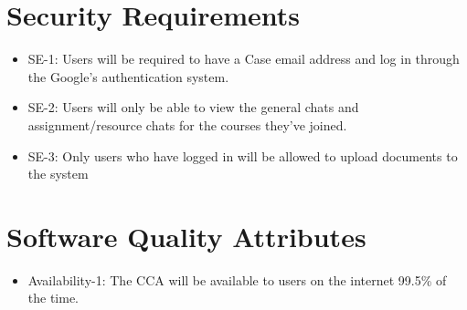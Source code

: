 \documentclass{scrreprt}
\begin{document}
\section{Security Requirements}
\begin{itemize}
	\item SE-1: Users will be required to have a Case email address and log in through the Google’s authentication system.
	\item SE-2: Users will only be able to view the general chats and assignment/resource chats for the courses they've joined.
	\item SE-3: Only users who have logged in will be allowed to upload documents to the system
\end{itemize}

\section{Software Quality Attributes}
\begin{itemize}
	\item Availability-1: The CCA will be available to users on the internet 99.5\% of the time.
\end{itemize}
\end{document}
